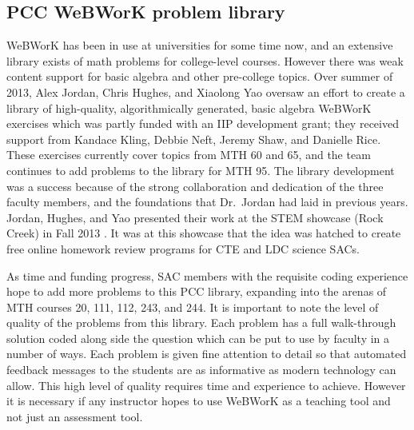 \subsection{PCC WeBWorK problem library}
WeBWorK has been in use at universities for some time now, and an extensive library exists of math problems for college-level courses. However there was weak content support for basic algebra and other pre-college topics. Over summer of 2013, Alex Jordan, Chris Hughes, and Xiaolong Yao oversaw an effort to create a library of high-quality, algorithmically generated, basic algebra WeBWorK exercises which was partly funded with an IIP development grant; they received support from Kandace Kling, Debbie Neft, Jeremy Shaw, and Danielle Rice.  These exercises currently cover topics from MTH 60 and 65, and the team continues to add problems to the library for MTH 95. The library development was a success because of the strong collaboration and dedication of the three faculty members, and the foundations that Dr.\ Jordan had laid in previous years. Jordan, Hughes, and Yao presented their work at the STEM showcase (Rock Creek) in Fall 2013 . It was at this showcase that the idea was hatched to create free online homework review programs for CTE and LDC science SACs.

As time and funding progress, SAC members with the requisite coding experience hope to add more problems to this PCC library, expanding into the arenas of MTH courses 20, 111, 112, 243, and 244. It is important to note the level of quality of the problems from this library. Each problem has a full walk-through solution coded along side the question which can be put to use by faculty in a number of ways. Each problem is given fine attention to detail so that automated feedback messages to the students are as informative as modern technology can allow. This high level of quality requires time and experience to achieve. However it is necessary if any instructor hopes to use WeBWorK as a teaching tool and not just an assessment tool.


